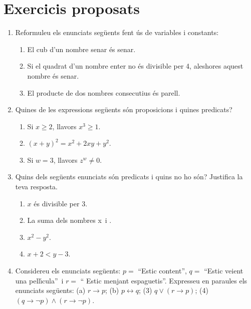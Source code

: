 \chapter{Exercicis proposats}
\label{cap:exercicis}

\begin{enumerate}
\item Reformuleu els enunciats seg\"{u}ents fent \'{u}s de variables i constants:

\begin{enumerate}
\item El cub d'un nombre senar \'{e}s senar.

\item Si el quadrat d'un nombre enter no \'{e}s divisible per 4, aleshores
aquest nombre \'{e}s senar.

\item El producte de dos nombres consecutius \'{e}s parell.
\end{enumerate}

\item Quines de les expressions seg\"{u}ents s\'{o}n proposicions i quines predicats?

\begin{enumerate}
\item Si $x\geq2$, llavors $x^{3}\geq1.$

\item $(x+y)^{2}=x^{2}+2xy+y^{2}$.

\item Si $w=3$, llavors $z^{w}\neq0$.
\end{enumerate}

\item Quins dels seg\"{u}ents enunciats s\'{o}n predicats i quins no ho
s\'{o}n? Justifica la teva resposta.\qquad

\begin{enumerate}
\item $x$ \'{e}s divisible per 3.

\item La suma dels nombres \thinspace x\thinspace\ i .

\item $x^{2}-y^{2}$.

\item $x+2<y-3$.
\end{enumerate}

\item Considereu els enunciats seg\"{u}ents: $p=$ \textquotedblleft Estic
content\textquotedblright, $q=$ \textquotedblleft Estic veient una
pel\textperiodcentered l\'{\i}cula\textquotedblright\ i $r=$ \textquotedblleft
Estic menjant espaguetis\textquotedblright. Expresseu en paraules els
enunciats seg\"{u}ents: (a) $r\longrightarrow p$; (b) $p\longleftrightarrow
q$; (3) $q\vee\left(  r\longrightarrow p\right)  $; (4) $\left(
q\longrightarrow\lnot p\right)  \wedge\left(  r\longrightarrow\lnot p\right)
$.


\end{enumerate}

